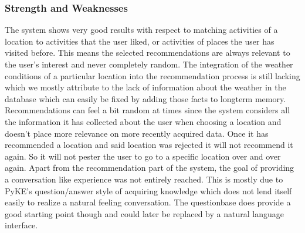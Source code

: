 \documentclass[11pt]{article} %
\begin{document}
\subsubsection{Strength and Weaknesses}
The system shows very good results with respect to matching activities of a location to activities that the user liked, or activities of places the user has visited before. This means the selected recommendations are always relevant to the user's interest and never completely random.
The integration of the weather conditions of a particular location into the recommendation process is still lacking which we mostly attribute to the lack of information about the weather in the database which can easily be fixed by adding those facts to longterm memory.
Recommendations can feel a bit random at times since the system considers all the information it has collected about the user when choosing a location and doesn't place more relevance on more recently acquired data.
Once it has recommended a location and said location was rejected it will not recommend it again. So it will not pester the user to go to a specific location over and over again.
Apart from the recommendation part of the system, the goal of providing a conversation like experience was not entirely reached. This is mostly due to PyKE's question/answer style of acquiring knowledge which does not lend itself easily to realize a natural feeling conversation. The questionbase does provide a good starting point though and could later be replaced by a natural language interface.
\end{document}
